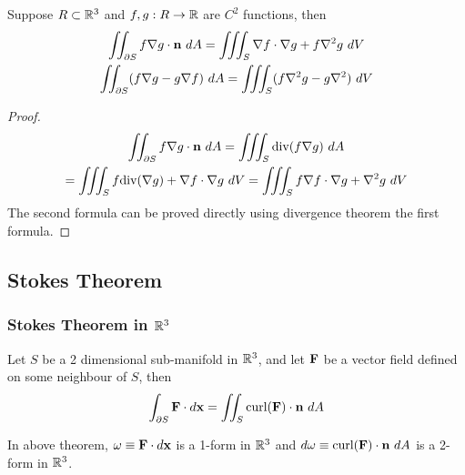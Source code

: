 \documentclass[11pt]{article}
\begin{document}
			\begin{corollary}
				Suppose $R \subset \mathbb{R}^3$ and $f, g: R \to \mathbb{R}$ are $C^2$ functions, then 
				\begin{gather}
					\iint_{\partial S} f \nabla g \cdot \textbf{n}\ dA = \iiint_S \nabla f \cdot \nabla g + f \nabla^2 g\ dV \\
					\iint_{\partial S} (f \nabla g - g \nabla f)\ dA = \iiint_S (f \nabla^2 g - g \nabla^2)\ dV
				\end{gather}
				\begin{proof}
					\begin{gather}
						\iint_{\partial S} f \nabla g \cdot \textbf{n}\ dA = \iiint_S \text{div}(f \nabla g)\ dA \\
						= \iiint_S f \text{div} (\nabla g) + \nabla f \cdot \nabla g\ dV 
						= \iiint_S f \nabla f \cdot \nabla g + \nabla^2 g\ dV
					\end{gather}
					The second formula can be proved directly using divergence theorem the first formula.
				\end{proof}
			\end{corollary}
			
		\subsection{Stokes Theorem}
		\subsubsection{Stokes Theorem in $\mathbb{R}^3$}
			\begin{theorem}
				Let $S$ be a 2 dimensional sub-manifold in $\mathbb{R}^3$, and let $\textbf{F}$ be a vector field defined on some neighbour of $S$, then
				\begin{equation}
					\int_{\partial S} \textbf{F}\cdot d\textbf{x} = \iint_S \text{curl}(\textbf{F})\cdot \textbf{n}\ dA
				\end{equation}
			\end{theorem}
			
			\begin{remark}
				In above theorem, $\omega \equiv \textbf{F} \cdot d \textbf{x}$ is a 1-form in $\mathbb{R}^3$ and $d \omega \equiv \text{curl}(\textbf{F}) \cdot \textbf{n}\ dA$ is a 2-form in $\mathbb{R}^3$.
			\end{remark}
			
\end{document}
